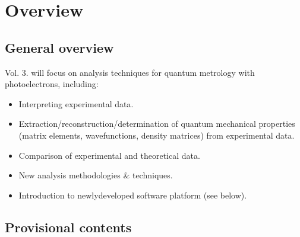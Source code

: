 \documentclass[letterpaper,table,10pt,english]{jupyterBook}
\begin{document}
\chapter{Overview}
\label{\detokenize{frontmatter/overview_270122:overview}}\label{\detokenize{frontmatter/overview_270122::doc}}

\section{General overview}
\label{\detokenize{frontmatter/overview_270122:general-overview}}
\sphinxAtStartPar
Vol. 3. will focus on analysis techniques for quantum metrology with photoelectrons, including:
\begin{itemize}
\item {} 
\sphinxAtStartPar
Interpreting experimental data.

\item {} 
\sphinxAtStartPar
Extraction/reconstruction/determination of quantum mechanical properties (matrix elements, wavefunctions, density matrices) from experimental data.

\item {} 
\sphinxAtStartPar
Comparison of experimental and theoretical data.

\item {} 
\sphinxAtStartPar
New analysis methodologies \& techniques.

\item {} 
\sphinxAtStartPar
Introduction to newly\sphinxhyphen{}developed software platform (see below).

\end{itemize}


\section{Provisional contents}
\label{\detokenize{frontmatter/overview_270122:provisional-contents}}
\end{document}
